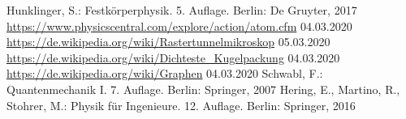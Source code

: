 \begin{thebibliography}{xxx}
        Hunklinger, S.: Festkörperphysik. 5. Auflage. Berlin: De Gruyter, 2017
        \url{https://www.physicscentral.com/explore/action/atom.cfm}
        04.03.2020
        \url{https://de.wikipedia.org/wiki/Rastertunnelmikroskop}
        05.03.2020
        \url{https://de.wikipedia.org/wiki/Dichteste_Kugelpackung}
        04.03.2020
        \url{https://de.wikipedia.org/wiki/Graphen}
        04.03.2020
        Schwabl, F.: Quantenmechanik I. 7. Auflage. Berlin: Springer, 2007
        Hering, E., Martino, R., Stohrer, M.: Physik für Ingenieure. 12. Auflage.
        Berlin: Springer, 2016
\end{thebibliography}
 
